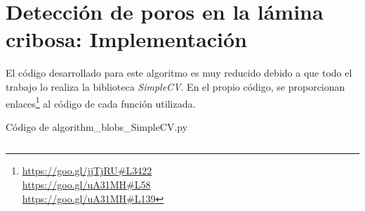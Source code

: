 \chapter{Detección de poros en la lámina cribosa: Implementación}

El código desarrollado para este algoritmo es muy reducido debido a
que todo el trabajo lo realiza la biblioteca \emph{SimpleCV}. En el
propio código, se proporcionan
enlaces\footnote{\url{https://goo.gl/jjTjRU\#L3422}
  \\\url{https://goo.gl/uA31MH\#L58}
  \\
  \url{https://goo.gl/uA31MH\#L139}}
al código de cada función utilizada.
\begin{codigo_python}
\caption{Código de algorithm\_blobs\_SimpleCV.py}
  \inputminted[fontsize=\scriptsize, linenos, breaklines]{python}{../OpenCV/algorithm_blobs_SimpleCV.py}
\end{codigo_python}